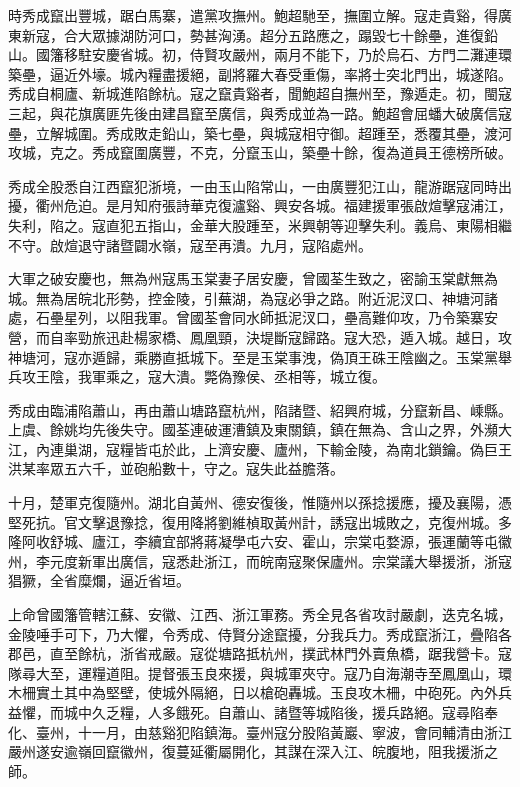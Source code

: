 \begin{pinyinscope}
時秀成竄出豐城，踞白馬寨，遣黨攻撫州。鮑超馳至，撫圍立解。寇走貴谿，得廣東新寇，合大眾據湖防河口，勢甚洶湧。超分五路應之，蹋毀七十餘壘，進復鉛山。國籓移駐安慶省城。初，侍賢攻嚴州，兩月不能下，乃於烏石、方門二灘連環築壘，逼近外壕。城內糧盡援絕，副將羅大春受重傷，率將士突北門出，城遂陷。秀成自桐廬、新城進陷餘杭。寇之竄貴谿者，聞鮑超自撫州至，豫遁走。初，閩寇三起，與花旗廣匪先後由建昌竄至廣信，與秀成並為一路。鮑超會屈蟠大破廣信寇壘，立解城圍。秀成敗走鉛山，築七壘，與城寇相守御。超踵至，悉覆其壘，渡河攻城，克之。秀成竄圍廣豐，不克，分竄玉山，築壘十餘，復為道員王德榜所破。

秀成全股悉自江西竄犯浙境，一由玉山陷常山，一由廣豐犯江山，龍游踞寇同時出擾，衢州危迫。是月知府張詩華克復瀘谿、興安各城。福建援軍張啟煊擊寇浦江，失利，陷之。寇直犯五指山，金華大股踵至，米興朝等迎擊失利。義烏、東陽相繼不守。啟煊退守諸暨闢水嶺，寇至再潰。九月，寇陷處州。

大軍之破安慶也，無為州寇馬玉棠妻子居安慶，曾國荃生致之，密諭玉棠獻無為城。無為居皖北形勢，控金陵，引蕪湖，為寇必爭之路。附近泥汊口、神塘河諸處，石壘星列，以阻我軍。曾國荃會同水師抵泥汊口，壘高難仰攻，乃令築寨安營，而自率勁旅迅赴楊家橋、鳳凰頸，決堤斷寇歸路。寇大恐，遁入城。越日，攻神塘河，寇亦遁歸，乘勝直抵城下。至是玉棠事洩，偽頂王硃王陰幽之。玉棠黨舉兵攻王陰，我軍乘之，寇大潰。斃偽豫侯、丞相等，城立復。

秀成由臨浦陷蕭山，再由蕭山塘路竄杭州，陷諸暨、紹興府城，分竄新昌、嵊縣。上虞、餘姚均先後失守。國荃連破運漕鎮及東關鎮，鎮在無為、含山之界，外瀕大江，內連巢湖，寇糧皆屯於此，上濟安慶、廬州，下輸金陵，為南北鎖鑰。偽巨王洪某率眾五六千，並砲船數十，守之。寇失此益膽落。

十月，楚軍克復隨州。湖北自黃州、德安復後，惟隨州以孫捻援應，擾及襄陽，憑堅死抗。官文擊退豫捻，復用降將劉維楨取黃州計，誘寇出城敗之，克復州城。多隆阿收舒城、廬江，李續宜部將蔣凝學屯六安、霍山，宗棠屯婺源，張運蘭等屯徽州，李元度新軍出廣信，寇悉赴浙江，而皖南寇聚保廬州。宗棠議大舉援浙，浙寇猖獗，全省糜爛，逼近省垣。

上命曾國籓管轄江蘇、安徽、江西、浙江軍務。秀全見各省攻討嚴劇，迭克名城，金陵唾手可下，乃大懼，令秀成、侍賢分途竄擾，分我兵力。秀成竄浙江，疊陷各郡邑，直至餘杭，浙省戒嚴。寇從塘路抵杭州，撲武林門外賣魚橋，踞我營卡。寇隊尋大至，運糧道阻。提督張玉良來援，與城軍夾守。寇乃自海潮寺至鳳凰山，環木柵實土其中為堅壁，使城外隔絕，日以槍砲轟城。玉良攻木柵，中砲死。內外兵益懼，而城中久乏糧，人多餓死。自蕭山、諸暨等城陷後，援兵路絕。寇尋陷奉化、臺州，十一月，由慈谿犯陷鎮海。臺州寇分股陷黃巖、寧波，會同輔清由浙江嚴州遂安逾嶺回竄徽州，復蔓延衢屬開化，其謀在深入江、皖腹地，阻我援浙之師。


\end{pinyinscope}
